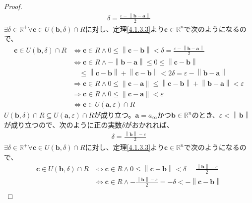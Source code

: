 \documentclass[dvipdfmx]{jsarticle}
\begin{document}
\begin{proof}
\begin{align*}
\delta = \frac{\varepsilon - \left\| \mathbf{b} - \mathbf{a} \right\|}{2}
\end{align*}
$\exists\delta \in \mathbb{R}^{+}\forall\mathbf{c} \in U\left( \mathbf{b},\delta \right) \cap R$に対し、定理\ref{4.1.3.3}より$\mathbf{c} \in \mathbb{R}^{n}$で次のようになるので、
\begin{align*}
\mathbf{c} \in U\left( \mathbf{b},\delta \right) \cap R &\Leftrightarrow \mathbf{c} \in R \land 0 \leq \left\| \mathbf{c} - \mathbf{b} \right\| < \delta = \frac{\varepsilon - \left\| \mathbf{b} - \mathbf{a} \right\|}{2}\\
&\Leftrightarrow \mathbf{c} \in R \land - \left\| \mathbf{b} - \mathbf{a} \right\| \leq 0 \leq \left\| \mathbf{c} - \mathbf{b} \right\| \\
&\quad \leq \left\| \mathbf{c} - \mathbf{b} \right\| + \left\| \mathbf{c} - \mathbf{b} \right\| < 2\delta = \varepsilon - \left\| \mathbf{b} - \mathbf{a} \right\|\\
&\Rightarrow \mathbf{c} \in R \land 0 \leq \left\| \mathbf{c} - \mathbf{a} \right\| \leq \left\| \mathbf{c} - \mathbf{b} \right\| + \left\| \mathbf{b} - \mathbf{a} \right\| < \varepsilon\\
&\Rightarrow \mathbf{c} \in R \land 0 \leq \left\| \mathbf{c} - \mathbf{a} \right\| < \varepsilon\\
&\Leftrightarrow \mathbf{c} \in U\left( \mathbf{a},\varepsilon \right) \cap R
\end{align*}
$U\left( \mathbf{b},\delta \right) \cap R \subseteq U\left( \mathbf{a},\varepsilon \right) \cap R$が成り立つ。$\mathbf{a} = a_{\infty}$かつ$\mathbf{b} \in \mathbb{R}^{n}$のとき、$\varepsilon < \left\| \mathbf{b} \right\|$が成り立つので、次のように正の実数$\delta$がおかれれば、
\begin{align*}
\delta = \frac{\left\| \mathbf{b} \right\| - \varepsilon}{2}
\end{align*}
$\exists\delta \in \mathbb{R}^{+}\forall\mathbf{c} \in U\left( \mathbf{b},\delta \right) \cap R$に対し、定理\ref{4.1.3.3}より$\mathbf{c} \in \mathbb{R}^{n}$で次のようになるので、
\begin{align*}
\mathbf{c} \in U\left( \mathbf{b},\delta \right) \cap R &\Leftrightarrow \mathbf{c} \in R \land 0 \leq \left\| \mathbf{c} - \mathbf{b} \right\| < \delta = \frac{\left\| \mathbf{b} \right\| - \varepsilon}{2}\\
&\Leftrightarrow \mathbf{c} \in R \land - \frac{\left\| \mathbf{b} \right\| - \varepsilon}{2} = - \delta < - \left\| \mathbf{c - b} \right\| \\

\end{align*}
\end{proof}
\end{document}

